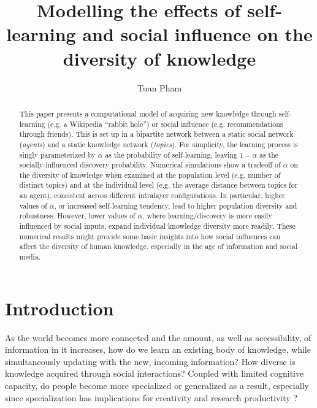 \documentclass{svproc}
\begin{document}
\mainmatter
\title{Modelling the effects of self-learning and social influence on the diversity of knowledge}


\author{Tuan Pham}

\def\githubrepo{https://github.com/tuanpham96/topic-diversity}

\maketitle

\begin{abstract}
    This paper presents a computational model of acquiring new knowledge through self-learning (e.g. a Wikipedia ``rabbit hole'') or social influence (e.g. recommendations through friends).
    This is set up in a bipartite network between a static social network (\textit{agents}) and a static knowledge network (\textit{topics}).
    For simplicity, the learning process is singly parameterized by $\alpha$ as the probability of self-learning, leaving $1-\alpha$ as the socially-influenced discovery probability.
    Numerical simulations show a tradeoff of $\alpha$ on the diversity of knowledge when examined at the population level (e.g. number of distinct topics) and at the individual level (e.g. the average distance between topics for an agent), consistent across different intralayer configurations.
    In particular, higher values of $\alpha$, or increased self-learning tendency, lead to higher population diversity and robustness.
    However, lower values of $\alpha$, where learning/discovery is more easily influenced by social inputs, expand individual knowledge diversity more readily.
    These numerical results might provide some basic insights into how social influences can affect the diversity of human knowledge, especially in the age of information and social media.
\end{abstract}

\section{Introduction} \label{sec:intro}

As the world becomes more connected
    and the amount, as well as accessibility, of information in it increases,
how do we learn an existing body of knowledge,
    while simultaneously updating with the new, incoming information?
How diverse is knowledge acquired through social interactions?
Coupled with limited cognitive capacity,
    do people become more specialized or generalized as a result,
    especially since specialization has implications for creativity and research productivity \cite{Teodoridis2019-tc}?
\end{document}
